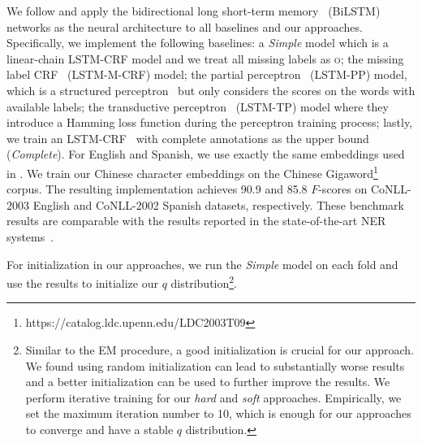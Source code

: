 We follow \citet{lample2016neural} and apply the bidirectional long short-term memory~\cite{hochreiter1997long} (BiLSTM) networks  as the neural architecture to all baselines and our approaches. 
Specifically, we implement the following baselines: 
a \textit{Simple} model which is a linear-chain LSTM-CRF model and we treat all missing labels as \textsc{o};
the missing label CRF~\cite{bellare2007learning,greenberg2018marginal} ({LSTM-M-CRF}) model;
the partial perceptron~\cite{carlson2009learning} ({LSTM-PP}) model, which is a structured perceptron~\cite{collins2002discriminative} but only considers the scores on the words with available labels; 
the transductive perceptron~\cite{fernandes2011learning} ({LSTM-TP}) model where they introduce a Hamming loss function during the perceptron training process; 
lastly, we train an LSTM-CRF~\cite{lample2016neural} with complete annotations as the upper bound (\textit{Complete}). 
For English and Spanish, we use exactly the same embeddings used in \citet{lample2016neural}. 
We train our Chinese character embeddings on the Chinese Gigaword\footnote{https://catalog.ldc.upenn.edu/LDC2003T09} corpus.
The resulting implementation achieves 90.9 and 85.8 $F$-scores on CoNLL-2003 English and CoNLL-2002 Spanish datasets, respectively. 
These benchmark results are comparable with the results reported in the state-of-the-art NER systems~\cite{lample2016neural,ma2016end,D17-1035}. 

For initialization in our approaches, we run  the {\em Simple} model on each fold and use the results to initialize our $q$ distribution\footnote{Similar to the EM procedure, a good initialization is crucial for our approach. We found using random initialization can lead to substantially worse results and a better initialization can be used to further improve the results. We perform iterative training for our {\it hard} and {\it soft} approaches. 
Empirically, we set the maximum iteration number to 10, which is enough for our approaches to converge and have a stable $q$ distribution. 
}.

